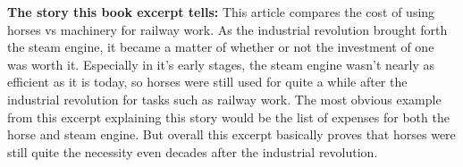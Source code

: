 

\textbf{The story this book excerpt tells:} This article compares the cost of using horses vs machinery for railway work.  As the industrial revolution brought forth the steam engine, it became a matter of whether or not the investment of one was worth it.  Especially in it's early stages, the steam engine wasn't nearly as efficient as it is today, so horses were still used for quite a while after the industrial revolution for tasks such as railway work.  The most obvious example from this excerpt explaining this story would be the list of expenses for both the horse and steam engine.  But overall this excerpt basically proves that horses were still quite the necessity even decades after the industrial revolution.